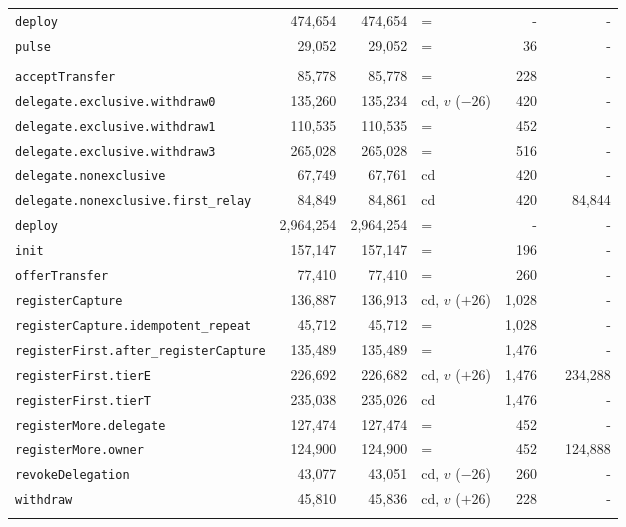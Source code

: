 \documentclass[10pt]{article}
\begin{document}
{\begin{longtable}{@{}lrrlrcr@{}}
\quad\texttt{deploy} & 474{,}654 & 474{,}654 & = & - &  & - \\
\quad\texttt{pulse} & 29{,}052 & 29{,}052 & = & 36 &  & - \\
\addlinespace[3pt]
\multicolumn{7}{@{}l}{\textbf{\texttt{ClaimRegistry}}}\\
\quad\texttt{acceptTransfer} & 85{,}778 & 85{,}778 & = & 228 &  & - \\
\quad\texttt{delegate.exclusive.withdraw0} & 135{,}260 & 135{,}234 & cd, $v$ ($-26$) & 420 &  & - \\
\quad\texttt{delegate.exclusive.withdraw1} & 110{,}535 & 110{,}535 & = & 452 &  & - \\
\quad\texttt{delegate.exclusive.withdraw3} & 265{,}028 & 265{,}028 & = & 516 &  & - \\
\quad\texttt{delegate.nonexclusive} & 67{,}749 & 67{,}761 & cd & 420 &  & - \\
\quad\texttt{delegate.nonexclusive.first\_relay} & 84{,}849 & 84{,}861 & cd & 420 &  & 84{,}844 \\
\quad\texttt{deploy} & 2{,}964{,}254 & 2{,}964{,}254 & = & - &  & - \\
\quad\texttt{init} & 157{,}147 & 157{,}147 & = & 196 &  & - \\
\quad\texttt{offerTransfer} & 77{,}410 & 77{,}410 & = & 260 &  & - \\
\quad\texttt{registerCapture} & 136{,}887 & 136{,}913 & cd, $v$ ($+26$) & 1{,}028 &  & - \\
\quad\texttt{registerCapture.idempotent\_repeat} & 45{,}712 & 45{,}712 & = & 1{,}028 &  & - \\
\quad\texttt{registerFirst.after\_registerCapture} & 135{,}489 & 135{,}489 & = & 1{,}476 &  & - \\
\quad\texttt{registerFirst.tierE} & 226{,}692 & 226{,}682 & cd, $v$ ($+26$) & 1{,}476 &  & 234{,}288 \\
\quad\texttt{registerFirst.tierT} & 235{,}038 & 235{,}026 & cd & 1{,}476 &  & - \\
\quad\texttt{registerMore.delegate} & 127{,}474 & 127{,}474 & = & 452 &  & - \\
\quad\texttt{registerMore.owner} & 124{,}900 & 124{,}900 & = & 452 &  & 124{,}888 \\
\quad\texttt{revokeDelegation} & 43{,}077 & 43{,}051 & cd, $v$ ($-26$) & 260 &  & - \\
\quad\texttt{withdraw} & 45{,}810 & 45{,}836 & cd, $v$ ($+26$) & 228 &  & - \\
\addlinespace[3pt]
\multicolumn{7}{@{}l}{\textbf{\texttt{DeviceRegistry}}}\\

\end{longtable}}
\end{document}
